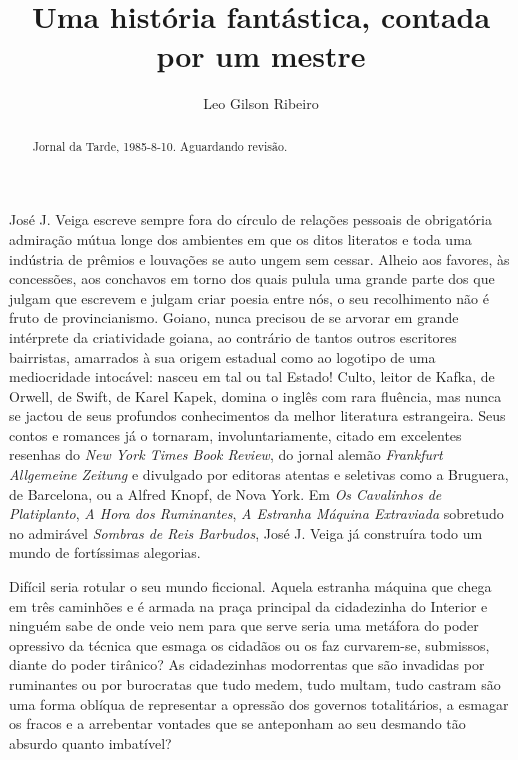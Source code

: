 \documentclass[
  letterpaper,
  DIV=11,
  numbers=noendperiod]{scrartcl}
\title{Uma história fantástica, contada por um mestre}
\author{Leo Gilson Ribeiro}
\date{}
\begin{document}
\maketitle
\begin{abstract}
Jornal da Tarde, 1985-8-10. Aguardando revisão.
\end{abstract}

José J. Veiga escreve sempre fora do círculo de relações pessoais de
obrigatória admiração mútua longe dos ambientes em que os ditos
literatos e toda uma indústria de prêmios e louvações se auto ungem sem
cessar. Alheio aos favores, às concessões, aos conchavos em torno dos
quais pulula uma grande parte dos que julgam que escrevem e julgam criar
poesia entre nós, o seu recolhimento não é fruto de provincianismo.
Goiano, nunca precisou de se arvorar em grande intérprete da
criatividade goiana, ao contrário de tantos outros escritores
bairristas, amarrados à sua origem estadual como ao logotipo de uma
mediocridade intocável: nasceu em tal ou tal Estado! Culto, leitor de
Kafka, de Orwell, de Swift, de Karel Kapek, domina o inglês com rara
fluência, mas nunca se jactou de seus profundos conhecimentos da melhor
literatura estrangeira. Seus contos e romances já o tornaram,
involuntariamente, citado em excelentes resenhas do \emph{New York Times
Book Review}, do jornal alemão \emph{Frankfurt Allgemeine Zeitung} e
divulgado por editoras atentas e seletivas como a Bruguera, de
Barcelona, ou a Alfred Knopf, de Nova York. Em \emph{Os Cavalinhos de
Platiplanto}, \emph{A Hora dos Ruminantes}, \emph{A Estranha Máquina
Extraviada} sobretudo no admirável \emph{Sombras de Reis Barbudos}, José
J. Veiga já construíra todo um mundo de fortíssimas alegorias.

Difícil seria rotular o seu mundo ficcional. Aquela estranha máquina que
chega em três caminhões e é armada na praça principal da cidadezinha do
Interior e ninguém sabe de onde veio nem para que serve seria uma
metáfora do poder opressivo da técnica que esmaga os cidadãos ou os faz
curvarem-se, submissos, diante do poder tirânico? As cidadezinhas
modorrentas que são invadidas por ruminantes ou por burocratas que tudo
medem, tudo multam, tudo castram são uma forma oblíqua de representar a
opressão dos governos totalitários, a esmagar os fracos e a arrebentar
vontades que se anteponham ao seu desmando tão absurdo quanto imbatível?
\end{document}
